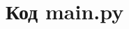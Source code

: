 \documentclass[bachelor, och, coursework]{SCWorks}
\begin{document}
\begin{thebibliography}{15}
  \end{thebibliography}

  \appendix

    \section{Код main.py}
\end{document}

